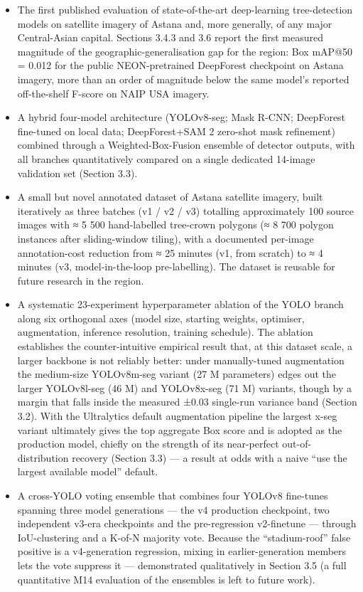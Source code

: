 \begin{itemize}
\tightlist
\item
  The first published evaluation of state-of-the-art deep-learning tree-detection models on satellite imagery of Astana and, more generally, of any major Central-Asian capital. Sections 3.4.3 and 3.6 report the first measured magnitude of the geographic-generalisation gap for the region: Box mAP@50 = 0.012 for the public NEON-pretrained DeepForest checkpoint on Astana imagery, more than an order of magnitude below the same model's reported off-the-shelf F-score on NAIP USA imagery.
\item
  A hybrid four-model architecture (YOLOv8-seg; Mask R-CNN; DeepForest fine-tuned on local data; DeepForest+SAM 2 zero-shot mask refinement) combined through a Weighted-Box-Fusion ensemble of detector outputs, with all branches quantitatively compared on a single dedicated 14-image validation set (Section 3.3).
\item
  A small but novel annotated dataset of Astana satellite imagery, built iteratively as three batches (v1 / v2 / v3) totalling approximately 100 source images with ≈ 5 500 hand-labelled tree-crown polygons (≈ 8 700 polygon instances after sliding-window tiling), with a documented per-image annotation-cost reduction from ≈ 25 minutes (v1, from scratch) to ≈ 4 minutes (v3, model-in-the-loop pre-labelling). The dataset is reusable for future research in the region.
\item
  A systematic 23-experiment hyperparameter ablation of the YOLO branch along six orthogonal axes (model size, starting weights, optimiser, augmentation, inference resolution, training schedule). The ablation establishes the counter-intuitive empirical result that, at this dataset scale, a larger backbone is not reliably better: under manually-tuned augmentation the medium-size YOLOv8m-seg variant (27 M parameters) edges out the larger YOLOv8l-seg (46 M) and YOLOv8x-seg (71 M) variants, though by a margin that falls inside the measured ±0.03 single-run variance band (Section 3.2). With the Ultralytics default augmentation pipeline the largest x-seg variant ultimately gives the top aggregate Box score and is adopted as the production model, chiefly on the strength of its near-perfect out-of-distribution recovery (Section 3.3) --- a result at odds with a naive ``use the largest available model'' default.
\item
  A cross-YOLO voting ensemble that combines four YOLOv8 fine-tunes spanning three model generations --- the v4 production checkpoint, two independent v3-era checkpoints and the pre-regression v2-finetune --- through IoU-clustering and a K-of-N majority vote. Because the ``stadium-roof'' false positive is a v4-generation regression, mixing in earlier-generation members lets the vote suppress it --- demonstrated qualitatively in Section 3.5 (a full quantitative M14 evaluation of the ensembles is left to future work).

\end{itemize}
